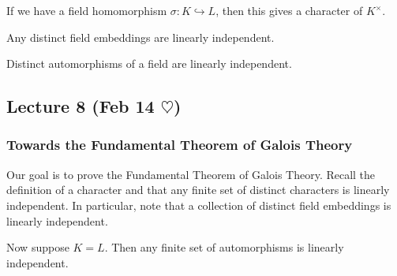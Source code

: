 \documentclass[10pt, twoside]{article}
\begin{document}
    If we have a field homomorphism $\sigma: K \hookrightarrow L$, then this
    gives a character of $K^{\times}$.

    \begin{cor} Any distinct field embeddings are linearly independent.
    \end{cor}

    \begin{cor} Distinct automorphisms of a field are linearly independent.
    \end{cor}

    \subsection{Lecture 8 (Feb 14 $\heartsuit$)} \subsubsection{Towards the
    Fundamental Theorem of Galois Theory}

    Our goal is to prove the Fundamental Theorem of Galois Theory. Recall the
    definition of a character and that any finite set of distinct characters is
    linearly independent. In particular, note that a collection of distinct
    field embeddings is linearly independent.

    Now suppose $K = L$. Then any finite set of automorphisms is linearly
    independent.
\end{document}
